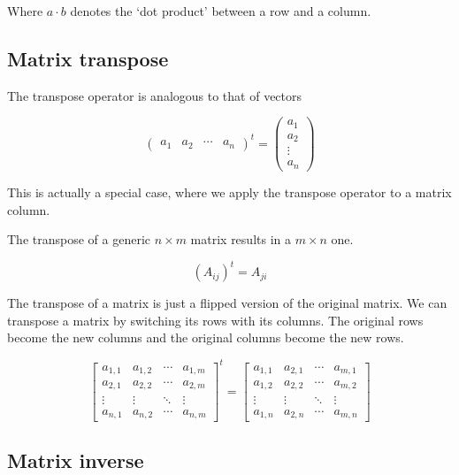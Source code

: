 \documentclass[a4paper]{article}
\begin{document}
Where \(a \cdot b\) denotes the `dot product' between a row and a column.

\subsection{Matrix transpose}

The transpose operator is analogous to that of vectors

\[
    \begin{pmatrix}
        a_1 & a_2 & \cdots & a_n
    \end{pmatrix}^t
    =
    \begin{pmatrix}
        a_1 \\
        a_2 \\
        \vdots \\
        a_n
    \end{pmatrix}
\]

This is actually a special case, where we apply the transpose operator to a matrix column.

The transpose of a generic \(n \times m\) matrix results in a \(m \times n\) one.

\[
    {\left(A_{ij}\right)}^t=A_{ji}
\]

The transpose of a matrix is just a flipped version of the original matrix.
We can transpose a matrix by switching its rows with its columns.
The original rows become the new columns and the original columns become the new rows.

\[
    {\begin{bmatrix} 
        a_{1,1} & a_{1,2} & \cdots & a_{1,m} \\
        a_{2,1} & a_{2,2} & \cdots & a_{2,m} \\
        \vdots  & \vdots  & \ddots & \vdots  \\
        a_{n,1} & a_{n,2} & \cdots & a_{n,m} 
    \end{bmatrix}}^t
    =
    \begin{bmatrix} 
        a_{1,1} & a_{2,1} & \cdots & a_{m,1} \\
        a_{1,2} & a_{2,2} & \cdots & a_{m,2} \\
        \vdots  & \vdots  & \ddots & \vdots  \\
        a_{1,n} & a_{2,n} & \cdots & a_{m,n} 
    \end{bmatrix}
\]

\subsection{Matrix inverse}
\end{document}
